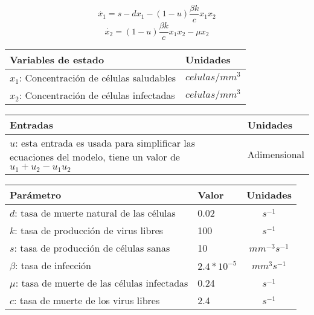 \documentclass{article}
\begin{document}
    \Large
    $$\dot{x_1} = s -dx_1 - (1-u) \frac{\beta k}{c} x_1 x_2$$
    $$\dot{x_2} = (1-u) \frac{\beta k}{c} x_1 x_2 - \mu x_2$$
    \normalsize

    \vspace{0.5cm}

    \begin{tabular}{|p{6cm} p{2.5cm}|}
        \hline
        \textbf{Variables de estado} & \textbf{Unidades} \\
        \hline
        $x_1$: Concentración de células saludables & $celulas / mm^3$\\
        $x_2$: Concentración de células infectadas & $celulas / mm^3$\\
        \hline
    \end{tabular}

    \vspace{0.5cm}

    \begin{tabular}{|p{8.5cm} p{2.5cm}|}
        \hline
        \textbf{Entradas} & \textbf{Unidades} \\
        \hline
        $u$: esta entrada es usada para simplificar las ecuaciones del modelo,
             tiene un valor de $u_1+u_2-u_1 u_2$ & Adimensional \\
        \hline
    \end{tabular}

    \vspace{0.5cm}

    \begin{tabular}{|p{7cm} p{2cm} c|}
        \hline
        \textbf{Parámetro} & \textbf{Valor} & \textbf{Unidades} \\
        \hline
        $d$: tasa de muerte natural de las células      & 0.02            & $s^{-1}$\\
        $k$: tasa de producción de virus libres         & 100             & $s^{-1}$\\
        $s$: tasa de producción de células sanas        & 10              & $mm^{-3} s^{-1}$\\
        $\beta$: tasa de infección                      & $2.4 * 10^{-5}$ & $mm^3 s^{-1}$\\
        $\mu$: tasa de muerte de las células infectadas & 0.24            & $s^{-1}$\\
        $c$: tasa de muerte de los virus libres         & 2.4             & $s^{-1}$\\
        \hline
    \end{tabular}
\end{document}
